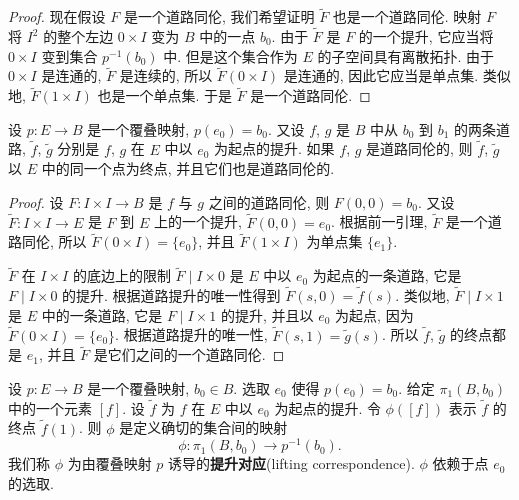 \begin{proof}
现在假设 $F$ 是一个道路同伦, 我们希望证明 $\widetilde{F}$ 也是一个道路同伦. 映射 $F$ 将 $I^2$ 的整个左边 $0\times I$ 变为 $B$ 中的一点 $b_0$. 由于 $\widetilde{F}$ 是 $F$ 的一个提升, 它应当将 $0\times I$ 变到集合 $p^{-1}(b_0)$ 中. 但是这个集合作为 $E$ 的子空间具有离散拓扑. 由于 $0\times I$ 是连通的, $\widetilde{F}$ 是连续的, 所以 $\widetilde{F}(0\times I)$ 是连通的, 因此它应当是单点集. 类似地, $\widetilde{F}(1\times I)$ 也是一个单点集. 于是 $\widetilde{F}$ 是一个道路同伦.
\end{proof}

\begin{theorem}
\label{theorem:ch09-sec54-54-3}
设 $p\colon E\to B$ 是一个覆叠映射, $p(e_0)=b_0$. 又设 $f$, $g$ 是 $B$ 中从 $b_0$ 到 $b_1$ 的两条道路, $\tilde{f}$, $\tilde{g}$ 分别是 $f$, $g$ 在 $E$ 中以 $e_0$ 为起点的提升. 如果 $f$, $g$ 是道路同伦的, 则 $\tilde{f}$, $\tilde{g}$ 以 $E$ 中的同一个点为终点, 并且它们也是道路同伦的.
\end{theorem}

\begin{proof}
设 $F\colon I\times I\to B$ 是 $f$ 与 $g$ 之间的道路同伦, 则 $F(0,0)=b_0$. 又设 $\widetilde{F}\colon I\times I\to E$ 是 $F$ 到 $E$ 上的一个提升, $\widetilde{F}(0,0)=e_0$. 根据前一引理, $\widetilde{F}$ 是一个道路同伦, 所以 $\widetilde{F}(0\times I)=\{e_0\}$, 并且 $\widetilde{F}(1\times I)$ 为单点集 $\{e_1\}$.

$\widetilde{F}$ 在 $I\times I$ 的底边上的限制 $\widetilde{F}\mid I\times 0$ 是 $E$ 中以 $e_0$ 为起点的一条道路, 它是 $F\mid I\times 0$ 的提升. 根据道路提升的唯一性得到 $\widetilde{F}(s,0)=\tilde{f}(s)$. 类似地, $\widetilde{F}\mid I\times 1$ 是 $E$ 中的一条道路, 它是 $F\mid I\times 1$ 的提升, 并且以 $e_0$ 为起点, 因为 $\widetilde{F}(0\times I)=\{e_0\}$. 根据道路提升的唯一性, $\widetilde{F}(s,1)=\tilde{g}(s)$. 所以 $\tilde{f}$, $\tilde{g}$ 的终点都是 $e_1$, 并且 $\widetilde{F}$ 是它们之间的一个道路同伦.
\end{proof}

\begin{definition}[提升对应]
\label{definition:ch09-sec54-phi}
设 $p\colon E\to B$ 是一个覆叠映射, $b_0\in B$. 选取 $e_0$ 使得 $p(e_0)=b_0$. 给定 $\pi_1(B,b_0)$ 中的一个元素 $[f]$. 设 $\tilde{f}$ 为 $f$ 在 $E$ 中以 $e_0$ 为起点的提升. 令 $\phi([f])$ 表示 $\tilde{f}$ 的终点 $\tilde{f}(1)$. 则 $\phi$ 是定义确切的集合间的映射
\[
\phi\colon\pi_{1}(B,b_{0})\longrightarrow p^{-1}(b_{0}).
\]
我们称 $\phi$ 为由覆叠映射 $p$ 诱导的\textbf{提升对应}(lifting correspondence). $\phi$ 依赖于点 $e_0$ 的选取.
\end{definition}

